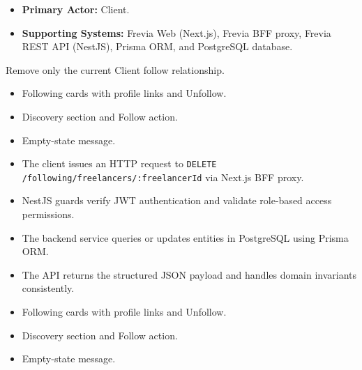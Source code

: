 
\begin{itemize}[leftmargin=1.6em,topsep=3pt,itemsep=2pt,parsep=0pt,label=$\bullet$]
    \item \textbf{Primary Actor:} Client.
    \item \textbf{Supporting Systems:} Frevia Web (Next.js), Frevia BFF proxy, Frevia REST API (NestJS), Prisma ORM, and PostgreSQL database.
\end{itemize}

\noindent Remove only the current Client follow relationship.

\begin{itemize}[leftmargin=1.6em,topsep=3pt,itemsep=2pt,parsep=0pt,label=$\bullet$]
    \item Following cards with profile links and Unfollow.
    \item Discovery section and Follow action.
    \item Empty-state message.
\end{itemize}

\begin{itemize}[leftmargin=1.6em,topsep=3pt,itemsep=2pt,parsep=0pt,label=$\bullet$]
    \item The client issues an HTTP request to \texttt{DELETE /\allowbreak{}following/\allowbreak{}freelancers/\allowbreak{}:\allowbreak{}freelancerId} via Next.js BFF proxy.
    \item NestJS guards verify JWT authentication and validate role-based access permissions.
    \item The backend service queries or updates entities in PostgreSQL using Prisma ORM.
    \item The API returns the structured JSON payload and handles domain invariants consistently.
\end{itemize}

\begin{itemize}[leftmargin=1.6em,topsep=3pt,itemsep=2pt,parsep=0pt,label=$\bullet$]
    \item Following cards with profile links and Unfollow.
    \item Discovery section and Follow action.
    \item Empty-state message.
\end{itemize}


